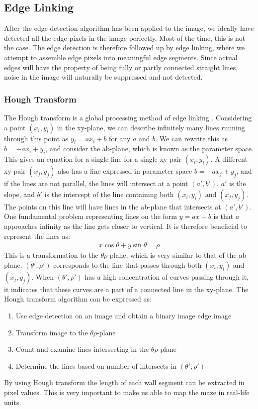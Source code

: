 \subsection{Edge Linking}
After the edge detection algorithm has been applied to the image, we ideally have detected all the edge pixels in the image perfectly. Most of the time, this is not the case. The edge detection is therefore followed up by edge linking, where we attempt to assemble edge pixels into meaningful edge segments. Since actual edges will have the property of being fully or partly connected straight lines, noise in the image will naturally be suppressed and not detected. 

\subsubsection{Hough Transform}\label{ch:hough}
The Hough transform is a global processing method of edge linking \cite{hough}.  Considering a point $(x_i,y_i)$ in the xy-plane, we can describe infinitely many lines running through this point as $y_i = ax_i + b$ for any $a$ and $b$. We can rewrite this as $b = -ax_i + y_i$, and consider the ab-plane, which is known as the parameter space. This gives an equation for a single line for a single xy-pair $(x_i,y_i)$. A different xy-pair $(x_j,y_j)$ also has a line expressed in parameter space $b = -ax_j + y_j$, and if the lines are not parallel, the lines will intersect at a point $(a',b')$. $a'$ is the slope, and $b'$ is the intercept of the line containing both $(x_i,y_i)$ and $(x_j,y_j)$. The points on this line will have lines in the ab-plane that intersects at $(a',b')$.\\

One fundamental problem representing lines on the form $y = ax + b$ is that $a$ approaches infinity as the line gets closer to vertical. It is therefore beneficial to represent the lines as:
\begin{align*}
x\cos{\theta} + y\sin{\theta} = \rho
\end{align*}
This is a transformation to the $\theta\rho$-plane, which is very similar to that of the ab-plane. $(\theta',\rho')$ corresponds to the line that passes through both $(x_i,y_i)$ and $(x_j,y_j)$. When $(\theta',\rho')$ has a high concentration of curves passing through it, it indicates that these curves are a part of a connected line in the xy-plane. The Hough transform algorithm can be expressed as\cite{g}:
\begin{enumerate}
\item Use edge detection on an image and obtain a binary image edge image
\item Transform image to the $\theta\rho$-plane
\item Count and examine lines intersecting in the $\theta\rho$-plane
\item Determine the lines based on number of intersects in $(\theta',\rho')$
\end{enumerate}
By using Hough transform the length of each wall segment can be extracted in pixel values. This is very important to make us able to map the maze in real-life units.

